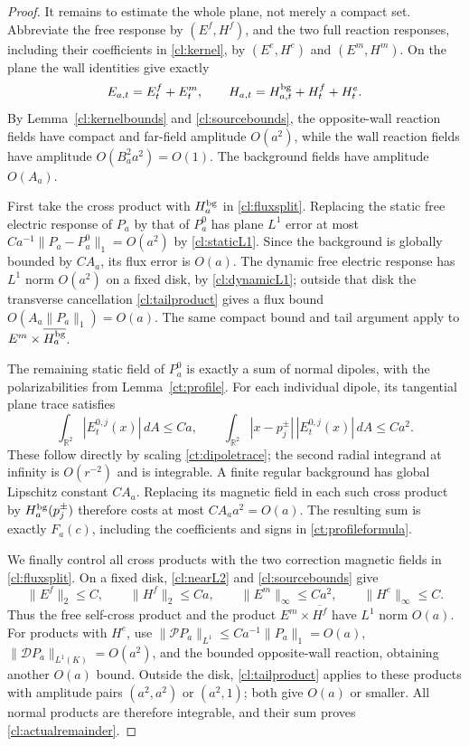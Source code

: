 \begin{proof}
It remains to estimate the whole plane, not merely a compact set.
Abbreviate the free response by $(E^f,H^f)$, and the two full
reaction responses, including their coefficients in
\eqref{cl:kernel}, by $(E^e,H^e)$ and $(E^m,H^m)$.
On the plane the wall identities give exactly
\begin{equation}\label{cl:fluxsplit}
 E_{a,t}=E^f_t+E^m_t,\qquad
 H_{a,t}=H^{\rm bg}_{a,t}+H^f_t+H^e_t.
\end{equation}
By Lemma~\ref{cl:kernelbounds} and \eqref{cl:sourcebounds}, the
opposite-wall reaction fields have compact and far-field amplitude
$O(a^2)$, while the wall reaction fields have amplitude
$O(B_a^2a^2)=O(1)$. The background fields have amplitude $O(A_a)$.

First take the cross product with $H^{\rm bg}_a$ in
\eqref{cl:fluxsplit}. Replacing the static free electric response
of $P_a$ by that of $P_a^0$ has plane $L^1$ error at most
$C a^{-1}\|P_a-P_a^0\|_1=O(a^2)$ by
\eqref{cl:staticL1}. Since the background is globally bounded by
$C A_a$, its flux error is $O(a)$. The dynamic free electric
response has $L^1$ norm $O(a^2)$ on a fixed disk, by
\eqref{cl:dynamicL1}; outside that disk the transverse cancellation
\eqref{cl:tailproduct} gives a flux bound
$O(A_a\|P_a\|_1)=O(a)$. The same compact bound and tail argument
apply to $E^m\times\overline{H^{\rm bg}_a}$.

The remaining static field of $P_a^0$ is exactly a sum of normal
dipoles, with the polarizabilities from Lemma~\ref{ct:profile}.
For each individual dipole, its tangential plane trace satisfies
\begin{equation}\label{cl:firstmoment}
 \int_{\mathbb R^2}|E^{0,j}_t(x)|\,dA\leq C a,
 \qquad
 \int_{\mathbb R^2}|x-p_j^{\pm}|\,|E^{0,j}_t(x)|\,dA
          \leq C a^2.
\end{equation}
These follow directly by scaling \eqref{ct:dipoletrace}; the
second radial integrand at infinity is $O(r^{-2})$ and is
integrable. A finite regular background has global Lipschitz
constant $C A_a$. Replacing its magnetic field in each such cross
product by $H^{\rm bg}_a(p_j^{\pm})$ therefore costs at most
$C A_a a^2=O(a)$. The resulting sum is exactly $F_a(c)$, including
the coefficients and signs in \eqref{ct:profileformula}.

We finally control all cross products with the two correction
magnetic fields in \eqref{cl:fluxsplit}. On a fixed disk,
\eqref{cl:nearL2} and \eqref{cl:sourcebounds} give
\[
 \|E^f\|_2\leq C,
 \qquad \|H^f\|_2\leq Ca,
 \qquad \|E^m\|_\infty\leq Ca^2,
 \qquad \|H^e\|_\infty\leq C.
\]
Thus the free self-cross product and the product
$E^m\times\overline{H^f}$ have $L^1$ norm $O(a)$.
For products with $H^e$, use
$\|\mathcal P P_a\|_{L^1}\leq C a^{-1}\|P_a\|_1=O(a)$,
$\|\mathcal D P_a\|_{L^1(K)}=O(a^2)$, and the bounded
opposite-wall reaction, obtaining another $O(a)$ bound.
Outside the disk, \eqref{cl:tailproduct} applies to these products
with amplitude pairs $(a^2,a^2)$ or $(a^2,1)$; both give $O(a)$
or smaller. All normal products are therefore integrable, and
their sum proves \eqref{cl:actualremainder}.
\end{proof}


